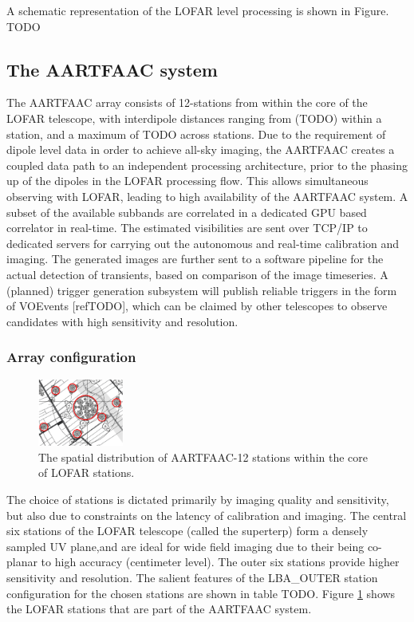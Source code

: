 \documentclass{ws-jai}
\begin{document}
A  schematic  representation   of  the  LOFAR  level  processing   is  shown  in
Figure. TODO

\subsection {\label{subsec:aartfaac}  The AARTFAAC system}
The AARTFAAC  array consists of  12-stations from within  the core of  the LOFAR
telescope, with interdipole distances ranging  from (TODO) within a station, and
a maximum of TODO across stations.  Due  to the requirement of dipole level data
in order to achieve all-sky imaging, the AARTFAAC creates a coupled data path to
an independent processing  architecture, prior to the phasing up  of the dipoles
in the  LOFAR processing  flow. This allows  simultaneous observing  with LOFAR,
leading to high  availability of the AARTFAAC system. A  subset of the available
subbands are  correlated in a dedicated  GPU based correlator in  real-time. The
estimated visibilities  are sent over  TCP/IP to dedicated servers  for carrying
out the autonomous and real-time  calibration and imaging.  The generated images
are further sent to a software  pipeline for the actual detection of transients,
based on  comparison of  the image timeseries.   A (planned)  trigger generation
subsystem  will publish  reliable triggers  in the  form of  VOEvents [refTODO],
which  can be  claimed  by  other telescopes  to  observe  candidates with  high
sensitivity and resolution.

\subsubsection {\label{subsubsec:arrayconf} Array configuration}

\begin{figure}[htbp]
\centering
\includegraphics[width=0.25\textwidth]{Figs/afaac12_arrayconfig.png}
\caption{The spatial distribution of AARTFAAC-12 stations within the core of LOFAR stations.}
\label{fig:afaac12_arrayconfig}
\end{figure}

The choice of stations is dictated primarily by imaging quality and sensitivity,
but  also due  to constraints  on the  latency of  calibration and  imaging. The
central  six stations  of  the LOFAR  telescope (called  the  superterp) form  a
densely sampled UV plane,and are ideal for wide field imaging due to their being
co-planar to  high accuracy (centimeter  level). The outer six  stations provide
higher  sensitivity  and resolution.  The  salient  features of  the  LBA\_OUTER
station configuration  for the chosen stations  are shown in table  TODO. Figure
\ref{fig:afaac12_arrayconfig}  shows the  LOFAR stations  that are  part of  the
AARTFAAC system.
\end{document}

